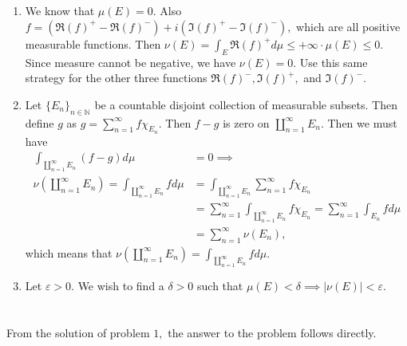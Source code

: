 \documentclass{article}
\begin{document}
\section{} %

\section{} %

\section{} \label{Prob6} %
\begin{enumerate}
	\item We know that $\mu(E)=0.$ Also $f= (\Re (f)^+ - \Re (f)^-)+i(\Im (f)^+ - \Im (f)^-),$ which are all positive measurable functions. Then $\nu(E)=\int_E \Re (f)^+ d\mu \leq +\infty \cdot \mu(E) \leq 0.$ Since measure cannot be negative, we have $\nu(E)=0.$ Use this same strategy for the other three functions $\Re (f)^-,\Im (f)^+,$ and $ \Im (f)^-.$
	\item Let $\{E_n\}_{n \in \mathbb{N}}$ be a countable disjoint collection of measurable subsets. Then define $g$ as $g= \sum_{n=1}^{\infty}f\chi_{E_n}.$ Then $f-g$ is zero on $\coprod_{n=1}^{\infty} E_n.$ Then we must have  
	\begin{align*}
		\int_{\coprod_{n=1}^{\infty}E_n}(f-g) d\mu&=0 \implies \\ \nu(\coprod_{n=1}^{\infty}E_n) =\int_{\coprod_{n=1}^{\infty}E_n}f d\mu &= \int_{\coprod_{n=1}^{\infty}E_n} \sum_{n=1}^{\infty} f\chi_{E_n}\\
		&=\sum_{n=1}^{\infty} \int_{\coprod_{n=1}^{\infty}E_n} f\chi_{E_n}=\sum_{n=1}^{\infty} \int_{E_n}f d\mu\\
		&= \sum_{n=1}^{\infty} \nu(E_n),
	\end{align*} which means that $\nu(\coprod_{n=1}^{\infty}E_n)=\int_{\coprod_{n=1}^{\infty}E_n}f d\mu.$
	\item Let $\varepsilon>0.$ We wish to find a $\delta >0$ such that $\mu(E)<\delta \implies |\nu(E)|<\varepsilon.$ 
\end{enumerate}

\section{} %
From the solution of problem $1,$ the answer to the problem follows directly.
\end{document}
